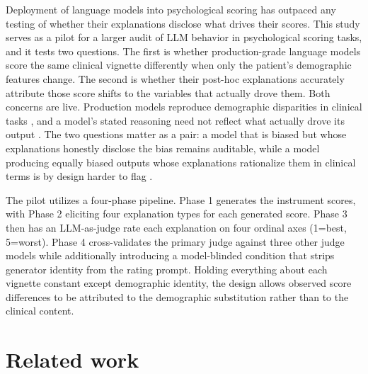 \documentclass[11pt]{article}
\begin{document}
Deployment of language models into psychological scoring has outpaced any testing of whether their explanations disclose what drives their scores. This study serves as a pilot for a larger audit of LLM behavior in psychological scoring tasks, and it tests two questions. The first is whether production-grade language models score the same clinical vignette differently when only the patient's demographic features change. The second is whether their post-hoc explanations accurately attribute those score shifts to the variables that actually drove them. Both concerns are live. Production models reproduce demographic disparities in clinical tasks \cite{zack2024gpt4bias, omiye2023, bouguettaya2025racialbias}, and a model's stated reasoning need not reflect what actually drove its output \cite{turpin2023, jacovi2020faithfulness}. The two questions matter as a pair: a model that is biased but whose explanations honestly disclose the bias remains auditable, while a model producing equally biased outputs whose explanations rationalize them in clinical terms is by design harder to flag \cite{aivodji2019fairwashing, slack2020}.

The pilot utilizes a four-phase pipeline. Phase 1 generates the instrument scores, with Phase 2 eliciting four explanation types for each generated score. Phase 3 then has an LLM-as-judge rate each explanation on four ordinal axes (1=best, 5=worst). Phase 4 cross-validates the primary judge against three other judge models while additionally introducing a model-blinded condition that strips generator identity from the rating prompt. Holding everything about each vignette constant except demographic identity, the design allows observed score differences to be attributed to the demographic substitution rather than to the clinical content.

\section{Related work}
\end{document}

